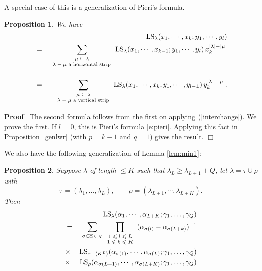 \documentclass[11pt]{amsart}
\newcommand{\tmop}[1]{\ensuremath{\operatorname{#1}}}
\newtheorem{proposition}{Proposition}
\renewenvironment{proof}{
\noindent\textbf{Proof}\ }{\hspace*{\fill}
\begin{math}\Box\end{math}\medskip}
\newcommand{\tmscript}[1]{\text{\scriptsize $#1$}}
\begin{document}
A special case of this is a generalization of Pieri's formula.
\begin{proposition}
\label{genpieri}We have
\begin{eqnarray*}
   & & \tmop{LS}_{\lambda} ( x_1, \cdots, x_k ; y_1, \cdots, y_l )
   \\& = &
   \sum_{\tmscript{\begin{array}{c}
     \mu \subseteq \lambda\\
     \text{$\lambda - \mu$ a horizontal strip}
   \end{array}}} \tmop{LS}_{\lambda} ( x_1, \cdots, x_{k - 1} ; y_1, \cdots,
   y_l ) \, x_k^{| \lambda | - | \mu |}\\
   &  & \\
   & = & \sum_{\tmscript{\begin{array}{c}
     \mu \subseteq \lambda\\
     \text{$\lambda - \mu$ a vertical strip}
   \end{array}}} \tmop{LS}_{\lambda} ( x_1, \cdots, x_k ; y_1, \cdots, y_{l -
   1} ) \, y_k^{| \lambda | - | \mu |} .
\end{eqnarray*}
\end{proposition}

\begin{proof}
The second formula follows from the first on applying
(\ref{interchange}). We prove the first. If $l = 0$, this is
Pieri's formula \eqref{e:pieri}. Applying this fact in
Proposition~\ref{genlwr} (with $p = k - 1$ and $q = 1$) gives the
result.
\end{proof}


We also have the following generalization of Lemma \ref{lem:min1}:

\begin{proposition}
\label{lem:min2}Suppose $\lambda$ of length $\leqslant K$ such
that $\lambda_L \geqslant \lambda_{L + 1} + Q$, let $\lambda =
\tau \cup \rho$ with
\[ \tau = ( \lambda_1, \ldots, \lambda_L ), \hspace{2em} \rho = (
    \lambda_{L + 1}, \cdots, \lambda_{L + K} ) . \]
Then
\begin{eqnarray}
   &&\tmop{LS}_{\lambda} ( \alpha_1, \cdots, \alpha_{L + K} ; \gamma_1, \ldots,
   \gamma_Q ) \nonumber \\ & = &\sum_{\sigma \in \Xi_{L, K}}
   \prod_{\tmscript{\begin{array}{c}
     1 \leqslant l \leqslant L\\
     1 \leqslant k \leqslant K
   \end{array}}} ( \alpha_{\sigma ( l )} - \alpha_{\sigma ( L + k )} )^{- 1}
   \nonumber\\&
   \times &\tmop{LS}_{\tau + \left\langle K^L \right\rangle} ( \alpha_{\sigma
   ( 1 )}, \cdots, \alpha_{\sigma ( L )} ; \gamma_1, \ldots, \gamma_Q )
   \nonumber\\&\times&
   \tmop{LS}_{\rho} ( \alpha_{\sigma ( L + 1 )}, \cdots, \alpha_{\sigma ( L +
   K )} ; \gamma_1, \ldots, \gamma_Q ) \label{lsminors}
\end{eqnarray}
\end{proposition}
\end{document}
